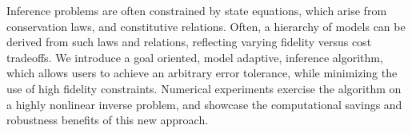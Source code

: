 Inference problems are often constrained by state equations, which arise from conservation laws, and constitutive relations. Often, a hierarchy of models can be derived from such laws and relations, reflecting varying fidelity versus cost tradeoffs. We introduce a goal oriented, model adaptive, inference algorithm, which allows users to achieve an arbitrary error tolerance, while minimizing the use of high fidelity constraints. Numerical experiments exercise the algorithm on a highly nonlinear inverse problem, and showcase the computational savings and robustness benefits of this new approach.
